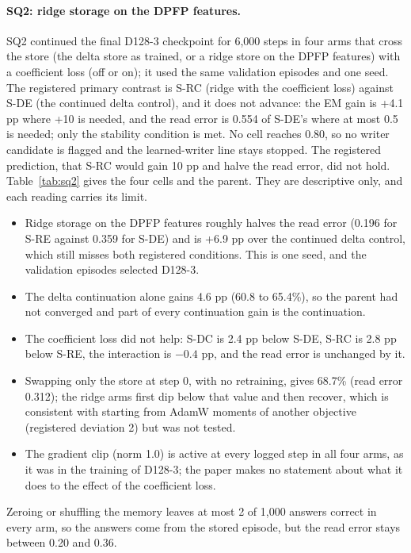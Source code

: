 \paragraph{SQ2: ridge storage on the DPFP features.}
SQ2 continued the final D128-3 checkpoint for 6,000 steps in four arms that cross the store (the delta store as trained, or a ridge store on the DPFP features) with a coefficient loss (off or on); it used the same validation episodes and one seed.
The registered primary contrast is S-RC (ridge with the coefficient loss) against S-DE (the continued delta control), and it does not advance: the EM gain is +4.1 pp where +10 is needed, and the read error is 0.554 of S-DE's where at most 0.5 is needed; only the stability condition is met.
No cell reaches 0.80, so no writer candidate is flagged and the learned-writer line stays stopped.
The registered prediction, that S-RC would gain 10 pp and halve the read error, did not hold.  %
Table~\ref{tab:sq2} gives the four cells and the parent.
They are descriptive only, and each reading carries its limit.  %
\begin{itemize}[leftmargin=1.4em,itemsep=2pt,topsep=3pt]
\item Ridge storage on the DPFP features roughly halves the read error (0.196 for S-RE against 0.359 for S-DE) and is +6.9 pp over the continued delta control, which still misses both registered conditions. This is one seed, and the validation episodes selected D128-3.  %
\item The delta continuation alone gains 4.6 pp (60.8 to 65.4\%), so the parent had not converged and part of every continuation gain is the continuation.  %
\item The coefficient loss did not help: S-DC is 2.4 pp below S-DE, S-RC is 2.8 pp below S-RE, the interaction is $-0.4$ pp, and the read error is unchanged by it.  %
\item Swapping only the store at step 0, with no retraining, gives 68.7\% (read error 0.312); the ridge arms first dip below that value and then recover, which is consistent with starting from AdamW moments of another objective (registered deviation 2) but was not tested.  %
\item The gradient clip (norm 1.0) is active at every logged step in all four arms, as it was in the training of D128-3; the paper makes no statement about what it does to the effect of the coefficient loss.  %
\end{itemize}
Zeroing or shuffling the memory leaves at most 2 of 1,000 answers correct in every arm, so the answers come from the stored episode, but the read error stays between 0.20 and 0.36.  %

